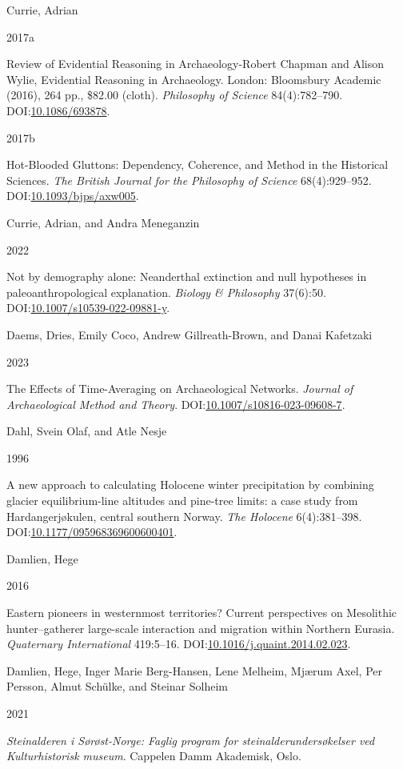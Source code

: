 \documentclass[
  12pt,
  a4paper,
  oneside]{book}
\newlength{\cslhangindent}
\newlength{\csllabelwidth}
\newlength{\cslentryspacingunit} %
\newenvironment{CSLReferences}[2] %
 {%
  \setlength{\parindent}{0pt}
  \ifodd #1
  \let\oldpar\par
  \def\par{\hangindent=\cslhangindent\oldpar}
  \fi
  \setlength{\parskip}{#2\cslentryspacingunit}
 }%
 {}
\newcommand{\CSLBlock}[1]{#1\hfill\break}
\newcommand{\CSLLeftMargin}[1]{\parbox[t]{\csllabelwidth}{#1}}
\newcommand{\CSLRightInline}[1]{\parbox[t]{\linewidth - \csllabelwidth}{#1}\break}
\begin{document}
\begin{CSLReferences}{0}{0}
\leavevmode{}%
\CSLBlock{Currie, Adrian}
\CSLLeftMargin{ 2017a}%
\CSLRightInline{{Review of Evidential Reasoning in Archaeology-Robert Chapman and Alison Wylie, Evidential Reasoning in Archaeology. London: Bloomsbury Academic (2016), 264 pp., \$82.00 (cloth)}. \emph{Philosophy of Science} 84(4):782--790. DOI:\href{https://doi.org/10.1086/693878}{10.1086/693878}.}

\leavevmode{}%
\CSLLeftMargin{ 2017b }%
\CSLRightInline{{Hot-Blooded Gluttons: Dependency, Coherence, and Method in the Historical Sciences}. \emph{The British Journal for the Philosophy of Science} 68(4):929--952. DOI:\href{https://doi.org/10.1093/bjps/axw005}{10.1093/bjps/axw005}.}

\leavevmode{}%
\CSLBlock{Currie, Adrian, and Andra Meneganzin}
\CSLLeftMargin{ 2022}%
\CSLRightInline{Not by demography alone: Neanderthal extinction and null hypotheses in paleoanthropological explanation. \emph{Biology \& Philosophy} 37(6):50. DOI:\href{https://doi.org/10.1007/s10539-022-09881-y}{10.1007/s10539-022-09881-y}.}

\leavevmode{}%
\CSLBlock{Daems, Dries, Emily Coco, Andrew Gillreath-Brown, and Danai Kafetzaki}
\CSLLeftMargin{ 2023}%
\CSLRightInline{{The Effects of Time-Averaging on Archaeological Networks}. \emph{Journal of Archaeological Method and Theory}. DOI:\href{https://doi.org/10.1007/s10816-023-09608-7}{10.1007/s10816-023-09608-7}.}

\leavevmode{}%
\CSLBlock{Dahl, Svein Olaf, and Atle Nesje}
\CSLLeftMargin{ 1996}%
\CSLRightInline{{A new approach to calculating Holocene winter precipitation by combining glacier equilibrium-line altitudes and pine-tree limits: a case study from Hardangerjøkulen, central southern Norway}. \emph{The Holocene} 6(4):381--398. DOI:\href{https://doi.org/10.1177/095968369600600401}{10.1177/095968369600600401}.}

\leavevmode{}%
\CSLBlock{Damlien, Hege}
\CSLLeftMargin{ 2016}%
\CSLRightInline{{Eastern pioneers in westernmost territories? Current perspectives on Mesolithic hunter--gatherer large-scale interaction and migration within Northern Eurasia}. \emph{Quaternary International} 419:5--16. DOI:\href{https://doi.org/10.1016/j.quaint.2014.02.023}{10.1016/j.quaint.2014.02.023}.}

\leavevmode{}%
\CSLBlock{Damlien, Hege, Inger Marie Berg-Hansen, Lene Melheim, Mjærum Axel, Per Persson, Almut Schülke, and Steinar Solheim}
\CSLLeftMargin{ 2021}%
\CSLRightInline{\emph{{Steinalderen i Sørøst-Norge: Faglig program for steinalderundersøkelser ved Kulturhistorisk museum}}. Cappelen Damm Akademisk, Oslo.}


\end{CSLReferences}
\end{document}
